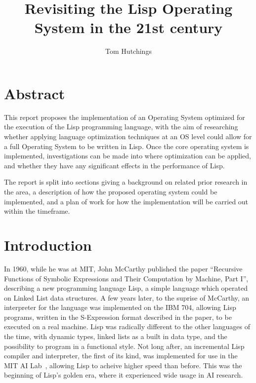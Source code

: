 \documentclass{article}
\begin{document}
  \title{Revisiting the Lisp Operating System in the 21st century}
  \author{Tom Hutchings}

  \maketitle

  \section{Abstract}
  This report proposes the implementation of an Operating System optimized for the execution of the Lisp programming language, with the aim of researching whether applying language optimization techniques at an OS level could allow for a full Operating System to be written in Lisp. Once the core operating system is implemented, investigations can be made into where optimization can be applied, and whether they have any significant effects in the performance of Lisp.
  \par
  
  The report is split into sections giving a background on related prior research in the area, a description of how the proposed operating system could be implemented, and a plan of work for how the implementation will be carried out within the timeframe.

  \section{Introduction}  
  In 1960, while he was at MIT, John McCarthy published the paper ``Recursive Functions of Symbolic Expressions and Their Computation by Machine, Part I''\cite{MccarthyJohn1960Rfos}, describing a new programming language Lisp, a simple language which operated on Linked List data structures. A few years later, to the suprise of McCarthy, an interpreter for the language was implemented on the IBM 704, allowing Lisp programs, written in the S-Expression format described in the paper, to be executed on a real machine. Lisp was radically different to the other languages of the time, with dynamic types, linked lists as a built in data type, and the possibility to program in a functional style. Not long after, an incremental Lisp compiler and interpreter, the first of its kind, was implemented for use in the MIT AI Lab~\cite{ai-memo-39}, allowing Lisp to acheive higher speed than before. This was the beginning of Lisp's golden era, where it experienced wide usage in AI research.
  \par
  
\end{document}
